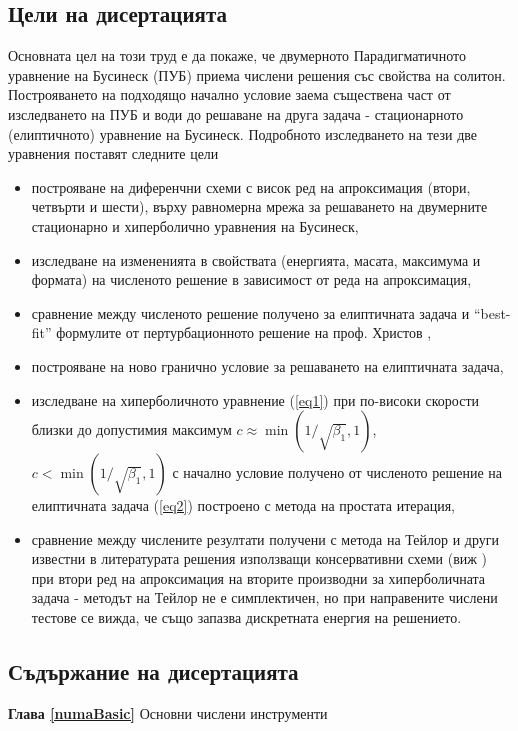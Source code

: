 \documentclass[a4paper]{article}
\newcommand{\rf}[1]{(\ref{#1})}
\theoremstyle{remark}
\begin{document}
\subsection{Цели на дисертацията}
Основната цел на този труд е да покаже, че двумерното Парадигматичното уравнение на Бусинеск (ПУБ) приема числени решения със свойства на солитон. Построяването на подходящо начално условие заема съществена част от изследването на ПУБ и води до решаване на друга задача - стационарното (елиптичното) уравнение на Бусинеск. Подробното изследването на тези две уравнения поставят следните цели
\begin{itemize}
  \item построяване на диференчни схеми с висок ред на апроксимация (втори, четвърти и шести), върху равномерна мрежа за решаването на двумерните стационарно и хиперболично уравнения на Бусинеск, 
  \item изследване на измененията в свойствата (енергията, масата, максимума и формата) на численото решение в зависимост от реда на апроксимация,
  \item сравнение между численото решение получено за елиптичната задача и ``best-fit'' формулите от пертурбационното решение на проф. Христов \cite{Ch2011},
  \item построяване на ново гранично условие за решаването на елиптичната задача,
  \item изследване на хиперболичното уравнение \rf{eq1} при по-високи скорости близки до допустимия максимум $c \approx \min (1/ \sqrt{\beta_1},1)$, $c < \min (1/ \sqrt{\beta_1},1)$ с начално условие получено от численото решение на елиптичната задача \rf{eq2} построено с метода на простата итерация,
  \item сравнение между числените резултати получени с метода на Тейлор и други известни в литературата решения използващи консервативни схеми (виж \cite{ref20, ref23}) при втори ред на апроксимация на вторите производни за хиперболичната задача - методът на Тейлор не е симплектичен, но при направените числени тестове се вижда, че също запазва дискретната енергия на решението.
\end{itemize}

\subsection{Съдържание на дисертацията}
 
\hspace*{\parindent}\textbf{Глава \ref{numaBasic}} Основни числени инструменти
\end{document}
